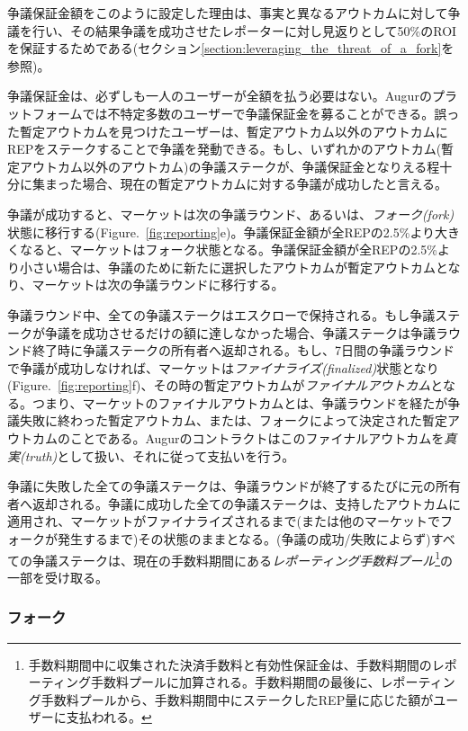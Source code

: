 \documentclass[floatfix,reprint,nofootinbib,amsmath,amssymb,epsfig,pre,floats,letterpaper,groupedaffiliation]{revtex4-1}
\theoremstyle{definition}
\theoremstyle{definition}
\theoremstyle{definition}
\begin{document}
争議保証金額をこのように設定した理由は、事実と異なるアウトカムに対して争議を行い、その結果争議を成功させたレポーターに対し見返りとして50\%のROIを保証するためである(セクション\ref{section:leveraging_the_threat_of_a_fork}を参照)。

争議保証金は、必ずしも一人のユーザーが全額を払う必要はない。Augurのプラットフォームでは不特定多数のユーザーで争議保証金を募ることができる。誤った暫定アウトカムを見つけたユーザーは、暫定アウトカム以外のアウトカムにREPをステークすることで争議を発動できる。もし、いずれかのアウトカム(暫定アウトカム以外のアウトカム)の争議ステークが、争議保証金となりえる程十分に集まった場合、現在の暫定アウトカムに対する争議が成功したと言える。

争議が成功すると、マーケットは次の争議ラウンド、あるいは、\textit{フォーク(fork)}状態に移行する(Figure.~\ref{fig:reporting}e)。争議保証金額が全REPの2.5\%より大きくなると、マーケットはフォーク状態となる。争議保証金額が全REPの2.5\%より小さい場合は、争議のために新たに選択したアウトカムが暫定アウトカムとなり、マーケットは次の争議ラウンドに移行する。

争議ラウンド中、全ての争議ステークはエスクローで保持される。もし争議ステークが争議を成功させるだけの額に達しなかった場合、争議ステークは争議ラウンド終了時に争議ステークの所有者へ返却される。もし、7日間の争議ラウンドで争議が成功しなければ、マーケットは\textit{ファイナライズ(finalized)}状態となり(Figure.~\ref{fig:reporting}f)、その時の暫定アウトカムが\textit{ファイナルアウトカム}となる。つまり、マーケットのファイナルアウトカムとは、争議ラウンドを経たが争議失敗に終わった暫定アウトカム、または、フォークによって決定された暫定アウトカムのことである。Augurのコントラクトはこのファイナルアウトカムを\textit{真実(truth)}として扱い、それに従って支払いを行う。

争議に失敗した全ての争議ステークは、争議ラウンドが終了するたびに元の所有者へ返却される。争議に成功した全ての争議ステークは、支持したアウトカムに適用され、マーケットがファイナライズされるまで(または他のマーケットでフォークが発生するまで)その状態のままとなる。(争議の成功/失敗によらず)すべての争議ステークは、現在の手数料期間にある\textit{レポーティング手数料プール}\footnote{手数料期間中に収集された決済手数料と有効性保証金は、手数料期間のレポーティング手数料プールに加算される。手数料期間の最後に、レポーティング手数料プールから、手数料期間中にステークしたREP量に応じた額がユーザーに支払われる。}の一部を受け取る。

\subsubsection{フォーク}\label{section:fork}
\end{document}
